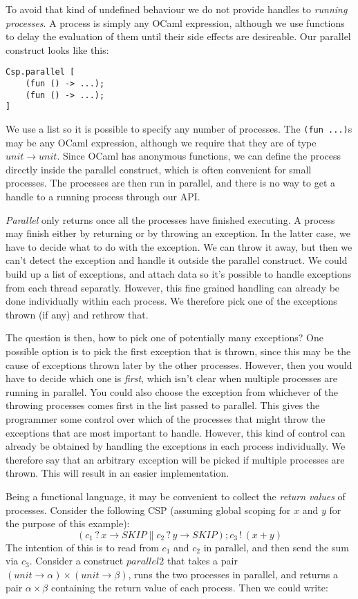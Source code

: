 \documentclass[a4paper,12pt]{article}
\begin{document}
To avoid that kind of undefined behaviour we do not provide handles to 
\emph{running processes}.
A process is simply any OCaml expression, although we use functions to delay the 
evaluation of them until their side effects are desireable. 
Our parallel construct looks like this:

\begin{verbatim}
Csp.parallel [
    (fun () -> ...);
    (fun () -> ...);
]
\end{verbatim}

We use a list so it is possible to specify any number of processes. The 
\verb|(fun ...)|s may be any OCaml expression, although we require that they are of type
$unit \to unit$. Since OCaml has anonymous functions, we can define the process directly 
inside the parallel construct, which is often convenient for small processes. The processes
are then run in parallel, and there is no way to get a handle to a running process
through our API.

{\it Parallel} only returns once all the processes have finished executing. A
process may finish either by returning or by throwing an exception. In the
latter case, we have to decide what to do with the exception. We can throw it
away, but then we can't detect the exception and handle it outside the parallel
construct. We could build up a list of exceptions, and attach data so it's
possible to handle exceptions from each thread separatly. However, this fine
grained handling can already be done individually within each process. We
therefore pick one of the exceptions thrown (if any) and rethrow that. 

The question is then, how to pick
one of potentially many exceptions? One possible option is to pick the first
exception that is thrown, since this may be the cause of exceptions thrown later
by the other processes. However, then you would have to decide which one is
{\it first}, which isn't clear when multiple processes are running in parallel.
You could also choose the exception from whichever of the throwing processes
comes first in the list passed to parallel. This gives the programmer some
control over which of the processes that might throw the exceptions that are
most important to handle. However, this kind of control can already be obtained
by handling the exceptions in each process individually. We therefore say that
an arbitrary exception will be picked if multiple processes are thrown. This
will result in an easier implementation.

Being a functional language, it may be convenient to collect the \emph{return
values} of processes. Consider the following CSP (assuming global scoping for
$x$ and $y$ for the purpose of this example):
\[(c_1\,?\,x \to SKIP \parallel c_2\,?\,y \to SKIP); c_3\,!\,(x + y)\]
The intention of this is to read from $c_1$ and $c_2$ in parallel, and then
send the sum via $c_3$. Consider a construct $parallel2$ that takes a pair 
$(unit \to \alpha) \times (unit \to \beta)$, runs the two processes in parallel,
and returns a pair $\alpha \times \beta$ containing the return value of each
process. Then we could write:
\end{document}
